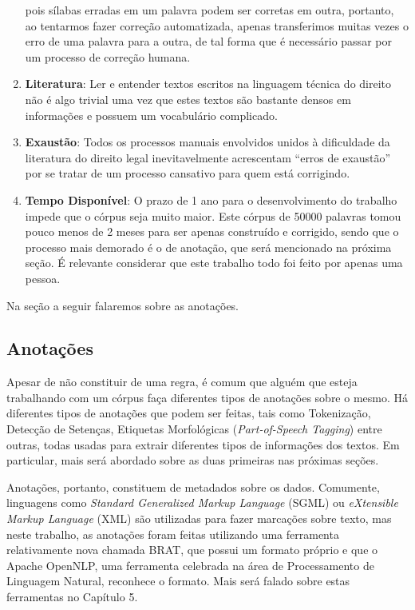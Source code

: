 \documentclass[11pt]{report}
\newcommand{\quotes}[1]{``#1''}
\begin{document}
\begin{enumerate}[label=\textbf{\arabic*.}]
  pois sílabas erradas em um palavra podem ser corretas em outra, portanto, ao tentarmos fazer correção automatizada, apenas transferimos muitas vezes o erro de uma palavra
  para a outra, de tal forma que é necessário passar por um processo de correção humana.
  \item \textbf{Literatura}: Ler e entender textos escritos na linguagem técnica do direito não é algo trivial uma vez que estes textos são bastante densos em informações e
  possuem um vocabulário complicado.
  \item \textbf{Exaustão}: Todos os processos manuais envolvidos unidos à dificuldade da literatura do direito legal inevitavelmente acrescentam \quotes{erros de exaustão}
  por se tratar de um processo cansativo para quem está corrigindo.
  \item \textbf{Tempo Disponível}: O prazo de 1 ano para o desenvolvimento do trabalho impede que o córpus seja muito maior. Este córpus de 50000 palavras tomou pouco menos de 2 meses
  para ser apenas construído e corrigido, sendo que o processo mais demorado é o de anotação, que será mencionado na próxima seção. É relevante considerar que este trabalho
  todo foi feito por apenas uma pessoa.
\end{enumerate}

Na seção a seguir falaremos sobre as anotações.

\subsection{Anotações}

\indent\indent Apesar de não constituir de uma regra, é comum que alguém que esteja trabalhando com um córpus faça diferentes tipos de anotações sobre o mesmo.
Há diferentes tipos de anotações que podem ser feitas, tais como Tokenização, Detecção de Setenças, Etiquetas Morfológicas (\textit{Part-of-Speech Tagging}) entre outras, todas
usadas para extrair diferentes tipos de informações dos textos. Em particular, mais será abordado sobre as duas primeiras nas próximas seções.

Anotações, portanto, constituem de metadados sobre os dados. Comumente, linguagens como \textit{Standard Generalized Markup Language} (SGML) ou
\textit{eXtensible Markup Language} (XML) são utilizadas para fazer marcações sobre texto, mas
neste trabalho, as anotações foram feitas utilizando uma ferramenta relativamente nova chamada BRAT, que possui um
formato próprio e que o Apache OpenNLP, uma ferramenta celebrada na área de Processamento de Linguagem Natural, reconhece o formato.
Mais será falado sobre estas ferramentas no Capítulo 5.
\end{document}
